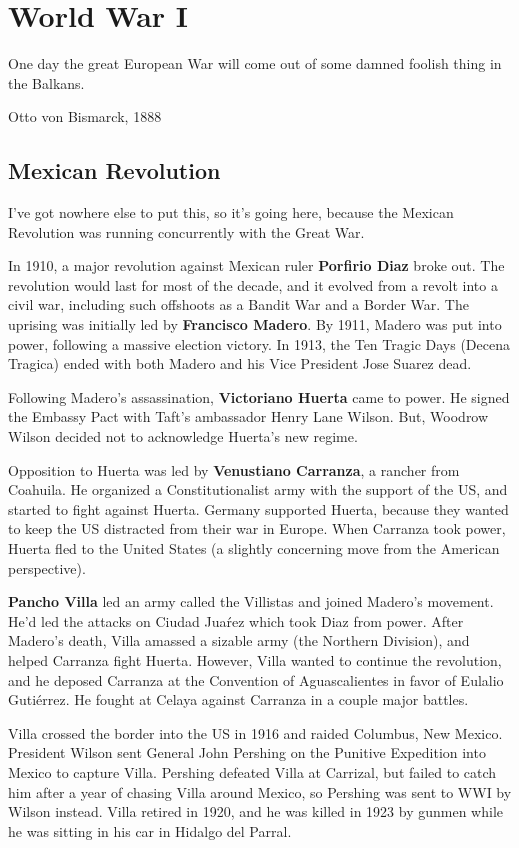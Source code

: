 \chapter{World War I}

\epigraph{%
  One day the great European War will come out of some damned foolish thing in the Balkans.
}{Otto von Bismarck, 1888}

\section{Mexican Revolution}

I've got nowhere else to put this, so it's going here,
because the Mexican Revolution was running concurrently with the Great War.

In 1910, a major revolution against Mexican ruler \textbf{Porfirio Diaz} broke out.
The revolution would last for most of the decade, and it evolved from a revolt into a civil war,
including such offshoots as a Bandit War and a Border War.
The uprising was initially led by \textbf{Francisco Madero}.
By 1911, Madero was put into power, following a massive election victory.
In 1913, the Ten Tragic Days (Decena Tragica) ended with both Madero and his Vice President Jose Suarez dead.

Following Madero's assassination, \textbf{Victoriano Huerta} came to power.
He signed the Embassy Pact with Taft's ambassador Henry Lane Wilson.
But, Woodrow Wilson decided not to acknowledge Huerta's new regime.

Opposition to Huerta was led by \textbf{Venustiano Carranza}, a rancher from Coahuila.
He organized a Constitutionalist army with the support of the US,
and started to fight against Huerta.
Germany supported Huerta,
because they wanted to keep the US distracted from their war in Europe.
When Carranza took power, Huerta fled to the United States
(a slightly concerning move from the American perspective).

\textbf{Pancho Villa} led an army called the Villistas and joined Madero's movement.
He'd led the attacks on Ciudad Jua\'rez which took Diaz from power.
After Madero's death, Villa amassed a sizable army (the Northern Division),
and helped Carranza fight Huerta.
However, Villa wanted to continue the revolution,
and he deposed Carranza at the Convention of Aguascalientes in favor of Eulalio Guti\'errez.
He fought at Celaya against Carranza in a couple major battles.

Villa crossed the border into the US in 1916 and raided Columbus, New Mexico.
President Wilson sent General John Pershing on the Punitive Expedition into Mexico to capture Villa.
Pershing defeated Villa at Carrizal,
but failed to catch him after a year of chasing Villa around Mexico,
so Pershing was sent to WWI by Wilson instead.
Villa retired in 1920,
and he was killed in 1923 by gunmen while he was sitting in his car in Hidalgo del Parral.

